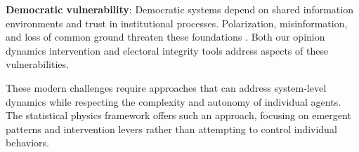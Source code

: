 \textbf{Democratic vulnerability}: Democratic systems depend on shared information environments and trust in institutional processes. Polarization, misinformation, and loss of common ground threaten these foundations \cite{homophily-and-polarization-in-the-age-of-misinformation}. Both our opinion dynamics intervention and electoral integrity tools address aspects of these vulnerabilities.

These modern challenges require approaches that can address system-level dynamics while respecting the complexity and autonomy of individual agents. The statistical physics framework offers such an approach, focusing on emergent patterns and intervention levers rather than attempting to control individual behaviors.

